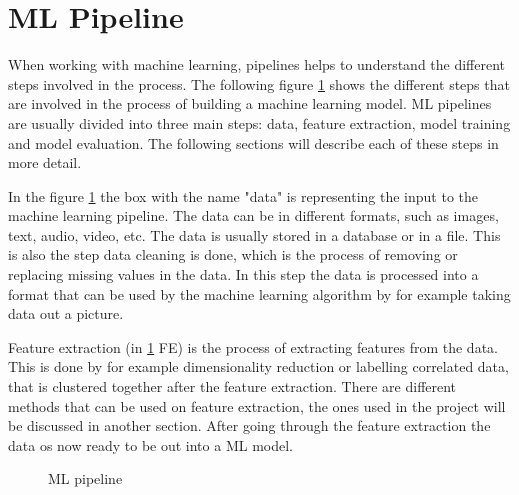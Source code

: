 \section{ML Pipeline}
When working with machine learning, pipelines helps to understand the different steps involved in the process. The following figure \ref{fig:ml-pipeline} shows the different steps that are involved in the process of building a machine learning model.
ML pipelines are usually divided into three main steps: data, feature extraction, model training and model evaluation. The following sections will describe each of these steps in more detail.

In the figure \ref{fig:ml-pipeline} the box with the name "data" is representing the input to the machine learning pipeline. The data can be in different formats, such as images, text, audio, video, etc. The data is usually stored in a database or in a file. This is also the step data cleaning is done, which is the process of removing or replacing missing values in the data. In this step the data is processed into a format that can be used by the machine learning algorithm by for example taking data out a picture.

Feature extraction (in \ref{fig:ml-pipeline} FE) is the process of extracting features from the data. This is done by for example dimensionality reduction or labelling correlated data, that is clustered together after the feature extraction. There are different methods that can be used on feature extraction, the ones used in the project will be discussed in another section. After going through the feature extraction the data os now ready to be out into a ML  model.


\begin{figure}
  \centering
  \caption{ML pipeline}
  \label{fig:ml-pipeline}
\end{figure}


